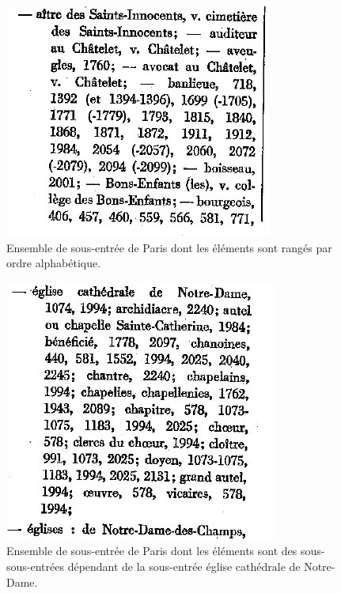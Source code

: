 \documentclass[a4paper,12pt,twoside]{book}
\begin{document}
	\begin{figure}
		\centering
		\includegraphics[width=\textwidth]{Images/Paris_sous_entrees_1.jpg}
		\caption{Ensemble de sous-entrée de \og Paris\fg{} dont les éléments sont rangés par ordre alphabétique.}
		\label{Paris_sous_entrée_1}
	\end{figure}

	\begin{figure}
		\centering
		\includegraphics[width=\textwidth]{Images/Paris_sous_entrees_2.jpg}
		\caption{Ensemble de sous-entrée de \og Paris\fg{} dont les éléments sont des sous-sous-entrées dépendant de la sous-entrée \og église cathédrale de Notre-Dame\fg{}.}
		\label{Paris_sous_entrée_2}
	\end{figure}
	
\end{document}

